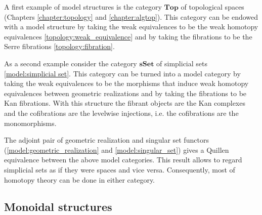     \begin{example}
        A first example of model structures is the category $\mathbf{Top}$ of topological spaces (Chapters \ref{chapter:topology} and \ref{chapter:algtop}). This category can be endowed with a model structure by taking the weak equivalences to be the weak homotopy equivalences \ref{topology:weak_equivalence} and by taking the fibrations to be the Serre fibrations \ref{topology:fibration}.
    \end{example}
    \begin{example}\label{model:sset_model_structure}
        As a second example consider the category $\mathbf{sSet}$ of simplicial sets \ref{model:simplicial set}. This category can be turned into a model category by taking the weak equivalences to be the morphisms that induce weak homotopy equivalences between geometric realizations and by taking the fibrations to be Kan fibrations. With this structure the fibrant objects are the Kan complexes and the cofibrations are the levelwise injections, i.e. the cofibrations are the monomorphisms.
    \end{example}
    \begin{property}[Quillen]\label{cat:quillen_sset_top}
        The adjoint pair of geometric realization and singular set functors (\ref{model:geometric_realization} and \ref{model:singular_set}) gives a Quillen equivalence between the above model categories. This result allows to regard simplicial sets as if they were spaces and vice versa. Consequently, most of homotopy theory can be done in either category.
    \end{property}

\subsection{Monoidal structures}

